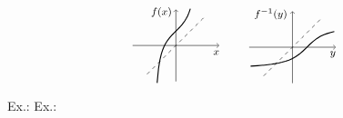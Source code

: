 \documentclass[8pt,handout]{beamer} %
\begin{document}

\raisebox{-\height}{\exoLNA} \qquad\qquad 
\raisebox{-\height}{\exoLNB}


\raisebox{-\height}{\exoSQRTA} \qquad
\raisebox{-\height}{\exoSQRTB} \qquad
\raisebox{-\height}{\exoSQRTC} 

$$
\grapheFF \qquad \grapheFFINV
$$


Ex.:\quad 
\raisebox{-.5\height}{\grapheXXTOT \quad \grapheXXRED \quad \grapheSQRT}
Ex.:\quad 
\raisebox{-.5\height}{\grapheSINTOT \quad \grapheSINRED \quad \grapheASINRED}

\end{document}
